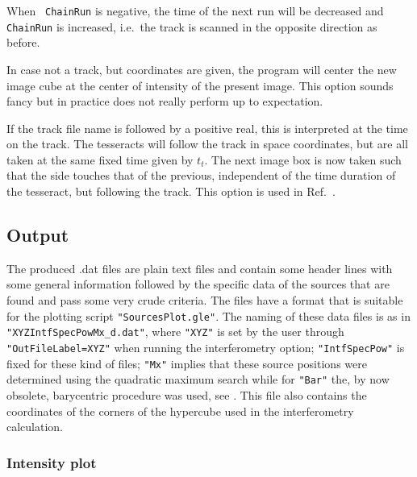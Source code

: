 When \verb# ChainRun# is negative, the time of the next run will be decreased and \verb# ChainRun# is increased, i.e.\ the track is scanned in the opposite direction as before. 

In case not a track, but coordinates are given, the program will center the new image cube at the center of intensity of the present image. This option sounds fancy but in practice does not really perform up to expectation.

If the track file name is followed by a positive real, this is interpreted at the time on the track. The tesseracts will follow the track in space coordinates, but are all taken at the same fixed time given by $t_t$. The next image box is now taken such that the side touches that of the previous, independent of the time duration of the tesseract, but following the track. This option is used in Ref.~\cite{Scholten:2023PL}. 

\subsection{Output}

The produced .dat files are plain text files and contain some header lines with some general information followed by the specific data of the sources that are found and pass some very crude criteria. The files have a format that is suitable for the plotting script \verb!"SourcesPlot.gle"!. The naming of these data files is as in \verb!"XYZIntfSpecPowMx_d.dat"!, where \verb!"XYZ"! is set by the user through \verb!"OutFileLabel=XYZ"! when running the interferometry option; \verb!"IntfSpecPow"! is fixed for these kind of files; \verb!"Mx"! implies that these source positions were determined using the quadratic maximum search while for \verb!"Bar"! the, by now obsolete, barycentric procedure was used, see .
This file also contains the coordinates of the corners of the hypercube used in the interferometry calculation.


\subsubsection{Intensity plot}

